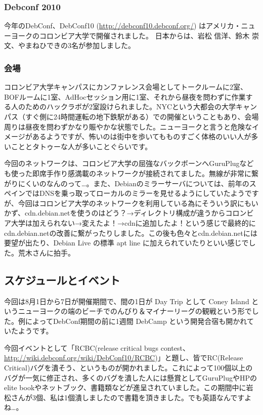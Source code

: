 \documentclass[mingoth,a4paper]{jsarticle}
\begin{document}
\subsubsection{Debconf 2010}
今年のDebConf、DebConf10 (\url{http://debconf10.debconf.org/}) はアメリカ・ニューヨークのコロンビア大学で開催されました。
日本からは、岩松 信洋、鈴木 崇文、やまねひできの3名が参加しました。

\subsubsection{会場}
コロンビア大学キャンパスにカンファレンス会場としてトークルームに2室、BOFルームに1室、AdHocセッション用に1室、それから昼夜を問わずに作業する人のためのハックラボが2室設けられました。NYCという大都会の大学キャンパス（すぐ側に24時間運転の地下鉄駅がある）での開催ということもあり、会場周りは昼夜を問わずかなり賑やかな状態でした。ニューヨークと言うと危険なイメージがあるようですが、怖いのは街中を歩いてもものすごく体格のいい人が多いこととタトゥーな人が多いことぐらいです。

今回のネットワークは、コロンビア大学の屈強なバックボーンへGuruPlugなども使った即席手作り感満載のネットワークが接続されてました。無線が非常に繋がりにくいのなんのって…。また、Debianのミラーサーバについては、前年のスペインではDNSを乗っ取ってローカルのミラーを見せるようにしていたようですが、今回はコロンビア大学のネットワークを利用している為にそういう訳にもいかず、cdn.debian.netを使うのはどう？→ディレクトリ構成が違うからコロンビア大学は加えられない→変えたよ！→cdnに追加したよ！という感じで最終的にcdn.debian.netの改善に繋がったりしました。この後も色々とcdn.debian.netには要望が出たり、Debian Live の標準 apt line に加えられていたりといい感じでした。荒木さんに拍手。

\subsection{スケジュールとイベント}
今回は8月1日から7日が開催期間で、間の1日が Day Trip として Coney Island というニューヨークの端のビーチでのんびり＆マイナーリーグの観戦という形でした。例によってDebConf期間の前に1週間 DebCamp という開発合宿も開かれていたようです。

今回イベントとして「RCBC(release critical bugs contest、\url{http://wiki.debconf.org/wiki/DebConf10/RCBC})」と題し、皆でRC(Release Critical)バグを潰そう、というものが開かれました。これによって100個以上のバグが一気に修正され、多くのバグを潰した人には懸賞としてGuruPlugやHPのelite bookやネットブック、書籍類などが進呈されていました。この期間中に岩松さんが3個、私は1個潰しましたので書籍を頂きました。でも英語なんですよね…。
\end{document}
